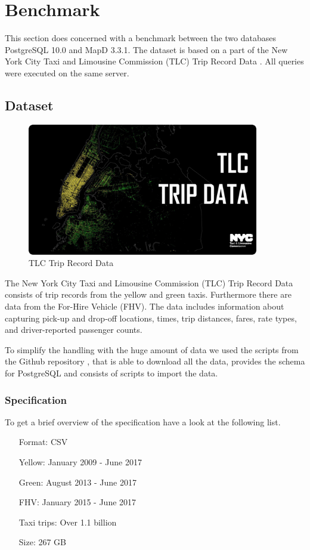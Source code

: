 \chapter{Benchmark}
This section does concerned with a benchmark between the two databases PostgreSQL 10.0 and MapD 3.3.1.
The dataset is based on a part of the New York City Taxi and Limousine Commission (TLC) Trip Record Data \cite{nyc}.
All queries were executed on the same server.

\section{Dataset}
\label{sec:dataset}
\begin{figure}[H]
\centering
\captionsetup{justification=centering}
\includegraphics[width=0.9\textwidth]{images/nyc_taxi.png}
\caption[Taxi Dropoffs]{TLC Trip Record Data}
\end{figure}

The New York City Taxi and Limousine Commission (TLC) Trip Record Data \cite{nyc} consists of trip records from the yellow and green taxis.
Furthermore there are data from the For-Hire Vehicle (FHV).
The data includes information about capturing pick-up and drop-off locations, times, trip distances, fares, rate types, and driver-reported passenger counts.

To simplify the handling with the huge amount of data we used the scripts from the Github repository \cite{nyctaxigithub}, that is able to download all the data, provides the schema for PostgreSQL and consists of scripts to import the data.

\subsection{Specification}
To get a brief overview of the specification have a look at the following list.
\begin{itemize}[noitemsep, topsep=0pt]
\itemsep-0.5em
 \item[Format:]  CSV
 \item[Yellow:]  January 2009 - June 2017
 \item[Green:]  August 2013 - June 2017
 \item[FHV:]  January 2015 - June 2017
 \item[Taxi trips:] Over 1.1 billion \cite{billion}
 \item[Size:] 267 GB \cite{billion}
\end{itemize}

